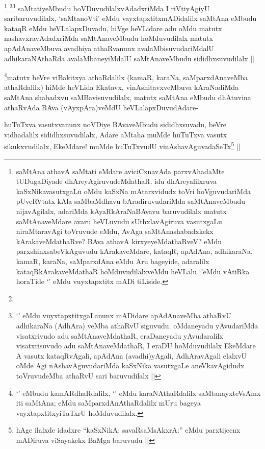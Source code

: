 \begin{artha}
\footnote{saMtAna athavA saMtati eMdare aviciCxnavAda parxvAhadaMte tUDugaDiyade dhAreyAgiruvudeMdathaR. idu dhAreyalilxruva kaSxNikavasutxgaLu oMdu kaSxNa mAtarxvidudx toVri hoVguvudariMda pUveRVtatx kAla saMbaMdhavu bAradiruvudariMda saMtAnaveMbudu nijavAgilalx, adariMda kAyaRkAraNaBAvavu baruvudilalx matutx saMtAnaveMdare avaru heVLuvudu sUthxlavAgiruva vasutxgaLu niraMtaravAgi toVruvude eMdu, AvAga saMtAnashabadxkekx kArakaveMdathaRve? BAva athavA kirxyeyeMdathaRveV? eMdu parxshinxsabeVkAguvudu kArakaveMdare, kataqR, apAdAna, adhikaraNa, kamaR, karaNa, saMparxdAna eMdu Aru bageyide, adaralilx kataqRkArakaveMdathaR hoMduvudilalxveMdu heVLalu `\stext'eMdu vAtiRka horaTide `\stext' eMdu vuyxtapxtitx mADi tiLiside.}
\footnote{}\footnote{`\stext' eMdu vuyxtapxtitxgaLanunx mADidare apAdAnaveMba athaRvU adhikaraNa (AdhAra) veMba athaRvU siguvudu. oMdaneyadu yAvudariMda visatxrivudo adu saMtAnaveMdathaR, eraDaneyadu yAvudaralilx visatxrisuvudo adu saMtAnaveMdathaR, I eraDU hoMduvudilalx EkeMdare A vasutx kataqRvAgali, apAdAna (avadhi)yAgali, AdhAravAgali elalxvU oMde Agi nAshavAguvudariMda kaSxNika vasutxgaLe aneVkavAgidudx toVruvudeMba athaRvU sari baruvudilalx ||}
saMtatiyeMbudu hoVDuvudilalxvAdadxriMda I riVtiyAgiyU saribaruvudilalx, `saMtanoVti' eMdu vayxtapxtitxmADidalilx saMtAna eMbudu kataqR eMdu heVLalapxDuvadu, hiVge heVLidare adu oMdu matutx nashavxravAdadxriMda saMtAnaveMbudu hoMduvudilalx matutx apAdAnaveMbuva avadhiya athaRvanunx avalaMbisuvudariMdalU adhikaraNAthaRda avalaMbaneyiMdalU saMtAnaveMbudu sididhxsuvudilalx ||
\end{artha}

\begin{artha}
\footnote{`\stext' eMbudu kamARdhaRdalilx, `\stext' eMdu karaNAthaRdalilx saMtanayxteV\s sAmx iti saMtAna; eMdu saMparxdAnAthaRdalilx mUru bageya vayxtapxtitxyiTaTxrU hoMduvudilalx.}matutx beVre viBakitxya athaRdalilx (kamaR, karaNa, saMparxdAnaveMba athaRdalilx) hiMde heVLida Ekatavx, vinAshitavxveMbuva kAraNadiMda saMtAna shabadxvu saMBavisuvudilalx, matutx saMtAna eMbudu dhAtuvina athaRvAda BAva (vAyxpAra)veMdU heVLalapxDuvudAdare-
\end{artha}

\begin{artha}
huTuTxva vasutxvanunx noVDiye BAvaveMbudu sididhxsuvadu, beVre vidhadalilx sididhxsuvudilalx, Adare aMtaha muMde huTuTxva vasutx sikukxvudilalx, EkeMdare! muMde huTuTxvudU vinAshavAguvadaSeTx\footnote{hAge ilalxde idadxre ``kaSxNikA: savaRsaMsAkxrA:'' eMdu parxtijecnx mADiruva viSayakekx BaMga baruvudu ||} ||
\end{artha}

